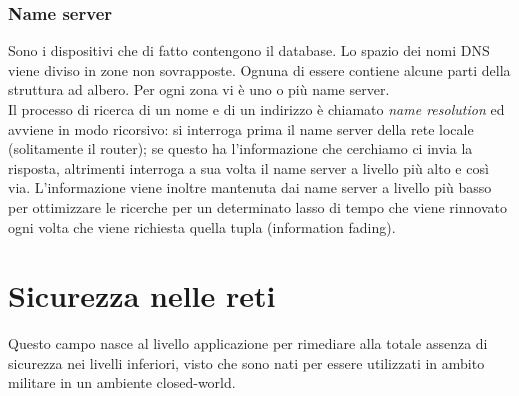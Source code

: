 \documentclass[10pt,a4paper,twoside]{article}
\begin{document}
\subsubsection{Name server}
Sono i dispositivi che di fatto contengono il database. Lo spazio dei nomi DNS viene diviso in zone non sovrapposte. Ognuna di essere contiene alcune parti della struttura ad albero. Per ogni zona vi è uno o più name server.\\
Il processo di ricerca di un nome e di un indirizzo è chiamato \textit{name resolution} ed avviene in modo ricorsivo: si interroga prima il name server della rete locale (solitamente il router); se questo ha l'informazione che cerchiamo ci invia la risposta, altrimenti interroga a sua volta il name server a livello più alto e così via. L'informazione viene inoltre mantenuta dai name server a livello più basso per ottimizzare le ricerche per un determinato lasso di tempo che viene rinnovato ogni volta che viene richiesta quella tupla (information fading).

\section{Sicurezza nelle reti}
Questo campo nasce al livello applicazione per rimediare alla totale assenza di sicurezza nei livelli inferiori, visto che sono nati per essere utilizzati in ambito militare in un ambiente closed-world.
\end{document}
